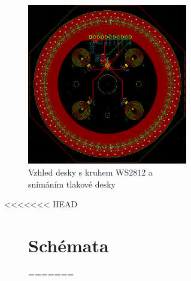 \begin{figure}
\begin{figure}
\begin{figure}
    \centering
    \includegraphics[width=\textwidth]{kapitoly/obrazky/E4/elektronika_tlakove_desky/leddeska-KiCad.png}
    \caption{Vzhled desky s kruhem WS2812 a snímáním tlakové desky}
    \label{fig:E4-LedDeska}
\end{figure}

<<<<<<< HEAD


\begin{figure}
	\section{Schémata}
    \vspace{\OdsazeniNadpisu}
=======
\begin{figure}

\end{figure}
\end{figure}
\end{figure}
\end{figure}
